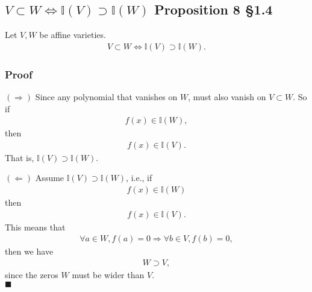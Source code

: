 \documentclass[11pt]{book}
\begin{document}
%
%
%
%
%
%
%
%
%
%
%
%
%


\subsection{$V \subset W \Leftrightarrow \mathbb{I}(V) \supset \mathbb{I}(W)$ Proposition 8 \S1.4}
Let $V,W$ be affine varieties.
\begin{eqnarray}
V \subset W \Leftrightarrow \mathbb{I}(V) \supset \mathbb{I}(W).
\end{eqnarray}

\subsubsection{Proof}
$(\Rightarrow)$ Since any polynomial that vanishes on $W$, must also vanish on $V \subset W$.
So if
\begin{eqnarray}
f(x) \in \mathbb{I}(W),
\end{eqnarray}
then
\begin{eqnarray}
f(x) \in \mathbb{I}(V).
\end{eqnarray}
That is, $\mathbb{I}(V) \supset \mathbb{I}(W)$.


$(\Leftarrow)$
Assume $\mathbb{I}(V) \supset \mathbb{I}(W)$, i.e., if
\begin{eqnarray}
f(x) \in \mathbb{I}(W)
\end{eqnarray}
then
\begin{eqnarray}
f(x) \in \mathbb{I}(V).
\end{eqnarray}
This means that
\begin{eqnarray}
\forall a \in W, f(a)=0 \Rightarrow \forall b \in V, f(b) = 0,
\end{eqnarray}
then we have
\begin{eqnarray}
W \supset V,
\end{eqnarray}
since the zeros $W$ must be wider than $V$.\\
$\blacksquare$
\end{document}
